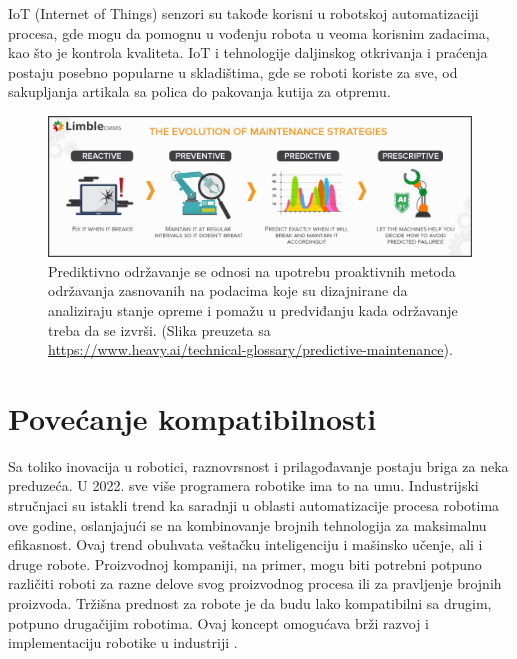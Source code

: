 \documentclass{article}
\begin{document}
	IoT (Internet of Things) senzori su takođe korisni u robotskoj automatizaciji procesa, gde mogu da pomognu u vođenju robota u veoma korisnim zadacima, kao što je kontrola kvaliteta. IoT i tehnologije daljinskog otkrivanja i praćenja postaju posebno popularne u skladištima, gde se roboti koriste za sve, od sakupljanja artikala sa polica do pakovanja kutija za otpremu\cite{robotics2022}.
	
    \begin{figure}
     \centering
	   \includegraphics[scale=0.37]{dijagram.jpeg}
	   \caption{Prediktivno održavanje se odnosi na upotrebu proaktivnih metoda održavanja zasnovanih na podacima koje su dizajnirane da analiziraju stanje opreme i pomažu u predviđanju kada održavanje treba da se izvrši. (Slika preuzeta sa \url{https://www.heavy.ai/technical-glossary/predictive-maintenance}).}
    \end{figure}
   

\newpage
	\section{Povećanje kompatibilnosti}
	Sa toliko inovacija u robotici, raznovrsnost i prilagođavanje postaju briga za neka preduzeća. U 2022. sve više programera robotike ima to na umu. Industrijski stručnjaci su istakli trend ka saradnji \cite{4 Robotic Process Automation (RPA) trends to watch in 2022} u oblasti automatizacije procesa robotima ove godine, oslanjajući se na kombinovanje brojnih tehnologija za maksimalnu efikasnost.
	Ovaj trend obuhvata veštačku inteligenciju i mašinsko učenje, ali i druge robote. Proizvodnoj kompaniji, na primer, mogu biti potrebni potpuno različiti roboti za razne delove svog proizvodnog procesa ili za pravljenje brojnih proizvoda. Tržišna prednost za robote je da budu lako kompatibilni sa drugim, potpuno drugačijim robotima. Ovaj koncept omogućava brži razvoj i implementaciju robotike u industriji \cite{robotics2022}.
	
  

 
\end{document}
